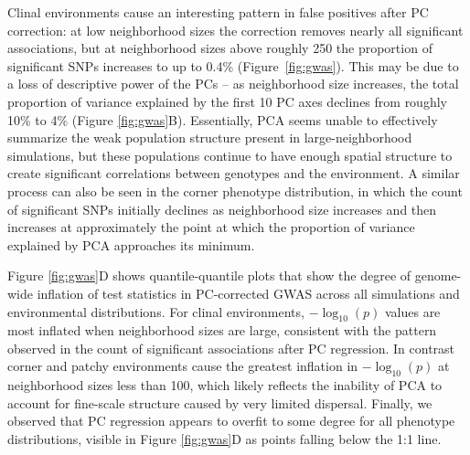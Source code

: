 \documentclass[10pt,twoside,lineno,hidelinks]{preprint}
\begin{document}
Clinal environments cause an interesting pattern in false positives after PC correction: at low neighborhood sizes the correction removes nearly all significant associations, 
but at neighborhood sizes above roughly 250 the proportion of significant SNPs increases to up to 0.4\% (Figure~\ref{fig:gwas}). 
This may be due to a loss of descriptive power of the PCs
-- as neighborhood size increases, the total proportion of variance explained by the first 10 PC axes declines from roughly 10\% to 4\% (Figure \ref{fig:gwas}B). 
Essentially, PCA seems unable to effectively summarize the weak population structure present in large-neighborhood simulations, but these populations continue to have enough spatial structure to create significant correlations between genotypes and the environment. A similar process can also be seen in the corner phenotype distribution, in which the count of significant SNPs initially declines as neighborhood size increases and then increases at approximately the point at which the proportion of variance explained by PCA approaches its minimum. 

Figure \ref{fig:gwas}D shows quantile-quantile plots that show the degree of genome-wide inflation of test statistics in PC-corrected GWAS across all simulations and environmental distributions. 
For clinal environments, $-\log_{10}(p)$ values are most inflated when neighborhood sizes are large, consistent with the pattern observed in the count of significant associations after PC regression. In contrast corner and patchy environments cause the greatest inflation in $-\log_{10}(p)$ at neighborhood sizes less than 100, which likely reflects the inability of PCA to account for fine-scale structure caused by very limited dispersal. Finally, we observed that PC regression appears to overfit to some degree for all phenotype distributions, visible in Figure \ref{fig:gwas}D as points falling below the 1:1 line.
\end{document}

